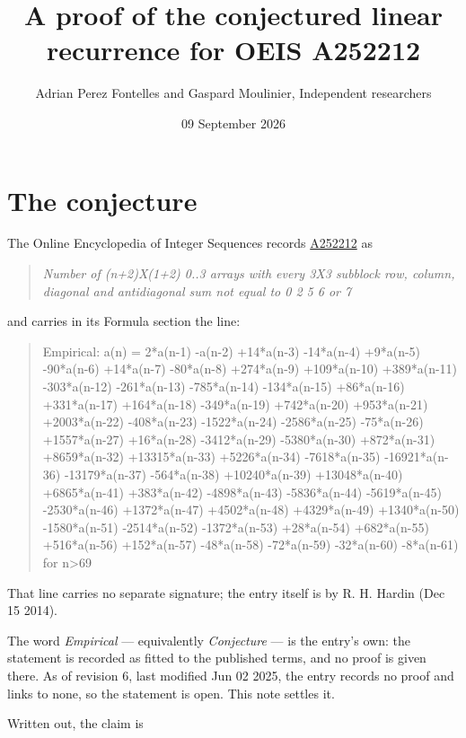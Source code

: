 \documentclass[11pt]{article}
\title{A proof of the conjectured linear recurrence for OEIS A252212}
\author{Adrian Perez Fontelles and Gaspard Moulinier, Independent researchers}
\date{09 September 2026}
\theoremstyle{definition}
\begin{document}
\maketitle
\section{The conjecture}

The Online Encyclopedia of Integer Sequences records \href{https://oeis.org/A252212}{A252212} as

\begin{quote}\itshape Number of (n+2)X(1+2) 0..3 arrays with every 3X3 subblock row, column, diagonal and antidiagonal sum not equal to 0 2 5 6 or 7\end{quote}

and carries in its Formula section the line:

\begin{quote}\ttfamily Empirical: a(n) = 2*a(n-1) -a(n-2) +14*a(n-3) -14*a(n-4) +9*a(n-5) -90*a(n-6) +14*a(n-7) -80*a(n-8) +274*a(n-9) +109*a(n-10) +389*a(n-11) -303*a(n-12) -261*a(n-13) -785*a(n-14) -134*a(n-15) +86*a(n-16) +331*a(n-17) +164*a(n-18) -349*a(n-19) +742*a(n-20) +953*a(n-21) +2003*a(n-22) -408*a(n-23) -1522*a(n-24) -2586*a(n-25) -75*a(n-26) +1557*a(n-27) +16*a(n-28) -3412*a(n-29) -5380*a(n-30) +872*a(n-31) +8659*a(n-32) +13315*a(n-33) +5226*a(n-34) -7618*a(n-35) -16921*a(n-36) -13179*a(n-37) -564*a(n-38) +10240*a(n-39) +13048*a(n-40) +6865*a(n-41) +383*a(n-42) -4898*a(n-43) -5836*a(n-44) -5619*a(n-45) -2530*a(n-46) +1372*a(n-47) +4502*a(n-48) +4329*a(n-49) +1340*a(n-50) -1580*a(n-51) -2514*a(n-52) -1372*a(n-53) +28*a(n-54) +682*a(n-55) +516*a(n-56) +152*a(n-57) -48*a(n-58) -72*a(n-59) -32*a(n-60) -8*a(n-61) for n>69\end{quote}

That line carries no separate signature; the entry itself is by R. H. Hardin (Dec 15 2014).

The word {\itshape Empirical} --- equivalently {\itshape Conjecture} --- is the entry's own: the statement is recorded as fitted to the published terms, and no proof is given there. As of revision 6, last modified Jun 02 2025, the entry records no proof and links to none, so the statement is open. This note settles it.

Written out, the claim is
\end{document}
